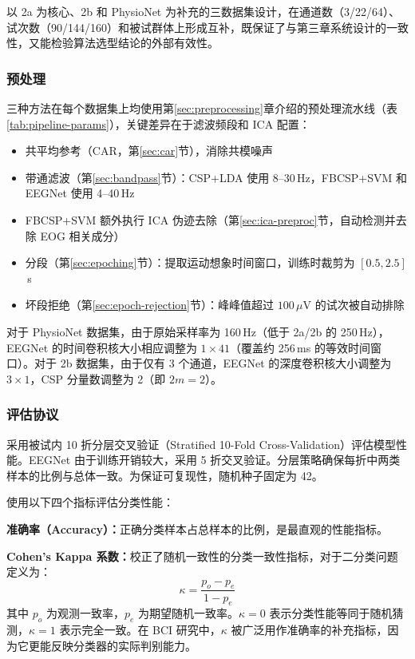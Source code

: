 以 2a 为核心、2b 和 PhysioNet 为补充的三数据集设计，在通道数（3/22/64）、试次数（90/144/160）和被试群体上形成互补，既保证了与第三章系统设计的一致性，又能检验算法选型结论的外部有效性。

\subsubsection{预处理}

三种方法在每个数据集上均使用第\ref{sec:preprocessing}章介绍的预处理流水线（表\ref{tab:pipeline-params}），关键差异在于滤波频段和 ICA 配置：
\begin{itemize}[leftmargin=2em]
	\item 共平均参考（CAR，第\ref{sec:car}节），消除共模噪声
	\item 带通滤波（第\ref{sec:bandpass}节）：CSP+LDA 使用 8--30\,Hz，FBCSP+SVM 和 EEGNet 使用 4--40\,Hz
	\item FBCSP+SVM 额外执行 ICA 伪迹去除（第\ref{sec:ica-preproc}节，自动检测并去除 EOG 相关成分）
	\item 分段（第\ref{sec:epoching}节）：提取运动想象时间窗口，训练时裁剪为 $[0.5, 2.5]$\,s
	\item 坏段拒绝（第\ref{sec:epoch-rejection}节）：峰峰值超过 $100\,\mu$V 的试次被自动排除
\end{itemize}

对于 PhysioNet 数据集，由于原始采样率为 160\,Hz（低于 2a/2b 的 250\,Hz），EEGNet 的时间卷积核大小相应调整为 $1 \times 41$（覆盖约 256\,ms 的等效时间窗口）。对于 2b 数据集，由于仅有 3 个通道，EEGNet 的深度卷积核大小调整为 $3 \times 1$，CSP 分量数调整为 2（即 $2m = 2$）。

\subsubsection{评估协议}

采用被试内 10 折分层交叉验证（Stratified 10-Fold Cross-Validation）评估模型性能。EEGNet 由于训练开销较大，采用 5 折交叉验证。分层策略确保每折中两类样本的比例与总体一致。为保证可复现性，随机种子固定为 42。

使用以下四个指标评估分类性能：

\textbf{准确率（Accuracy）：}正确分类样本占总样本的比例，是最直观的性能指标。

\textbf{Cohen's Kappa 系数：}校正了随机一致性的分类一致性指标，对于二分类问题定义为：
\begin{equation}\label{eq:kappa}
\kappa = \frac{p_o - p_e}{1 - p_e}
\end{equation}
其中 $p_o$ 为观测一致率，$p_e$ 为期望随机一致率。$\kappa = 0$ 表示分类性能等同于随机猜测，$\kappa = 1$ 表示完全一致。在 BCI 研究中，$\kappa$ 被广泛用作准确率的补充指标，因为它更能反映分类器的实际判别能力。

